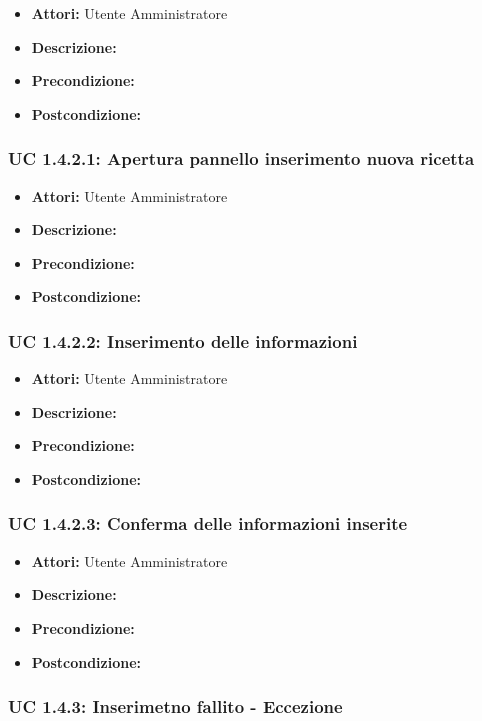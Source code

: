 \begin{itemize}
\item \textbf{Attori:} Utente Amministratore
\item \textbf{Descrizione:} 
\item \textbf{Precondizione:} 
\item \textbf{Postcondizione:} 
\end{itemize}

\subsubsection{UC 1.4.2.1: Apertura pannello inserimento nuova ricetta}

\begin{itemize}
\item \textbf{Attori:} Utente Amministratore
\item \textbf{Descrizione:} 
\item \textbf{Precondizione:} 
\item \textbf{Postcondizione:} 
\end{itemize}

\subsubsection{UC 1.4.2.2: Inserimento delle informazioni }

\begin{itemize}
\item \textbf{Attori:} Utente Amministratore
\item \textbf{Descrizione:} 
\item \textbf{Precondizione:} 
\item \textbf{Postcondizione:} 
\end{itemize}

\subsubsection{UC 1.4.2.3: Conferma delle informazioni inserite}

\begin{itemize}
\item \textbf{Attori:} Utente Amministratore
\item \textbf{Descrizione:} 
\item \textbf{Precondizione:} 
\item \textbf{Postcondizione:} 
\end{itemize}

\subsubsection{UC 1.4.3: Inserimetno fallito - Eccezione}

